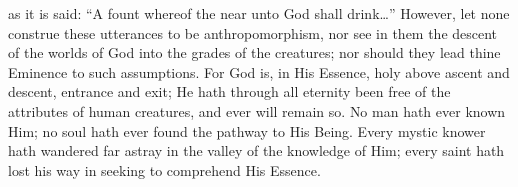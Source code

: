 \documentclass[12pt]{article}
\begin{document}
\vspace{2ex}
 {
as it is said: ``A fount whereof the near unto God shall drink\dots{}''\footnotemark[31]
}
\vspace{2ex}
 {
However, let none construe these utterances to be anthropomorphism,
}
\vspace{2ex}
 {
nor see in them the descent of the worlds of God into the grades of the creatures; nor should they lead thine Eminence to such assumptions.
}
\vspace{2ex}
 {
For God is, in His Essence, holy above ascent and descent, entrance and exit;
}
\vspace{2ex}
 {
He hath through all eternity been free of the attributes of human creatures, and ever will remain so.
}
\vspace{2ex}
 {
No man hath ever known Him; no soul hath ever found the pathway to His Being.
}
\vspace{2ex}
 {
Every mystic knower hath wandered far astray in the valley of the knowledge of Him; every saint hath lost his way in seeking to comprehend His Essence.
}
\end{document}
